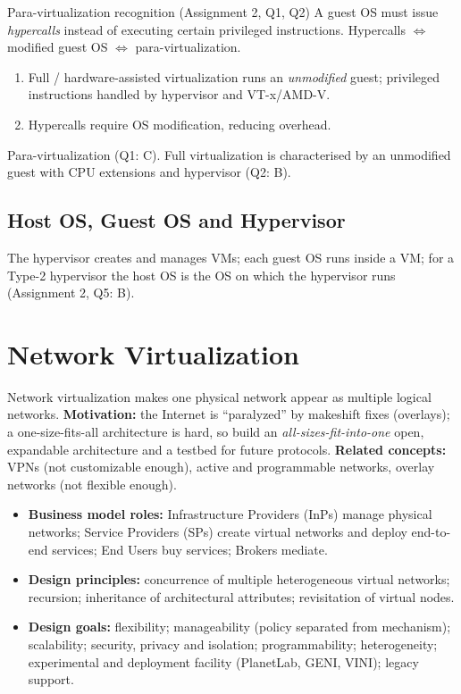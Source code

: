 \begin{solved}{Para-virtualization recognition (Assignment 2, Q1, Q2)}
\Given A guest OS must issue \emph{hypercalls} instead of executing certain privileged instructions.
\Formula Hypercalls $\Leftrightarrow$ modified guest OS $\Leftrightarrow$ para-virtualization.
\Steps
\begin{enumerate}[leftmargin=*]
  \item Full / hardware-assisted virtualization runs an \emph{unmodified} guest; privileged instructions handled
        by hypervisor and VT-x/AMD-V.
  \item Hypercalls require OS modification, reducing overhead.
\end{enumerate}
\Answer Para-virtualization (Q1: C). Full virtualization is characterised by an unmodified guest with
CPU extensions and hypervisor (Q2: B).
\end{solved}

\subsection{Host OS, Guest OS and Hypervisor}
The hypervisor creates and manages VMs; each guest OS runs inside a VM; for a Type-2 hypervisor the host OS is
the OS on which the hypervisor runs (Assignment 2, Q5: B).

\section{Network Virtualization}
Network virtualization makes one physical network appear as multiple logical networks.
\textbf{Motivation:} the Internet is ``paralyzed'' by makeshift fixes (overlays); a one-size-fits-all
architecture is hard, so build an \emph{all-sizes-fit-into-one} open, expandable architecture and a testbed for
future protocols. \textbf{Related concepts:} VPNs (not customizable enough), active and programmable networks,
overlay networks (not flexible enough).

\begin{itemize}[leftmargin=*]
  \item \textbf{Business model roles:} Infrastructure Providers (InPs) manage physical networks; Service
        Providers (SPs) create virtual networks and deploy end-to-end services; End Users buy services; Brokers
        mediate.
  \item \textbf{Design principles:} concurrence of multiple heterogeneous virtual networks; recursion; inheritance
        of architectural attributes; revisitation of virtual nodes.
  \item \textbf{Design goals:} flexibility; manageability (policy separated from mechanism); scalability;
        security, privacy and isolation; programmability; heterogeneity; experimental and deployment
        facility (PlanetLab, GENI, VINI); legacy support.
\end{itemize}

